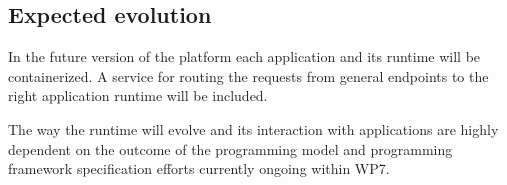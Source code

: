 


\subsection{Expected evolution}

In the future version of the platform each application and its runtime will be containerized. A service for routing the requests from general endpoints to the right application runtime will be included.

The way the runtime will evolve and its interaction with applications are highly dependent on the outcome of the programming model and programming framework specification efforts currently ongoing within WP7.